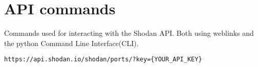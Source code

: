 \section{API commands}
Commands used for interacting with the Shodan API. Both using weblinks\cite{api_ref} and the python Command Line Interface(CLI)\cite{cli_ref}.

\begin{lstlisting}[label=lst:api_ports,caption=Ports API call]
https://api.shodan.io/shodan/ports/?key={YOUR_API_KEY}
\end{lstlisting}